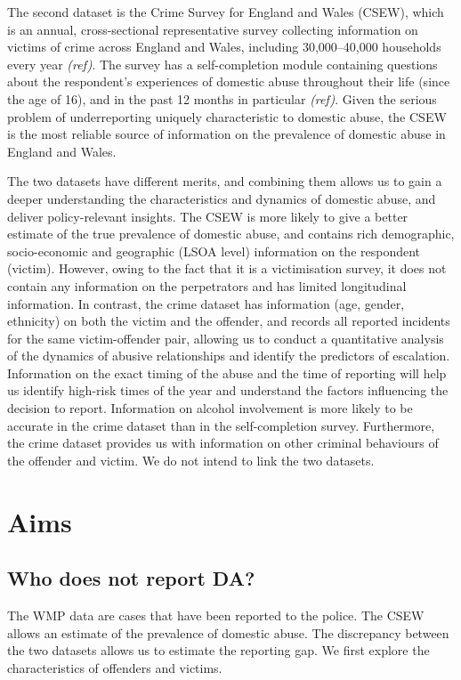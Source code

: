 \documentclass[11pt, a4paper]{article}
\begin{document}
The second dataset is the Crime Survey for England and Wales (CSEW), which is an annual, cross-sectional representative survey collecting information on victims of crime across England and Wales, including 30,000--40,000 households every year \textit{(ref)}. The survey has a self-completion module containing questions about the respondent's experiences of domestic abuse throughout their life (since the age of 16), and in the past 12 months in particular \textit{(ref)}. Given the serious problem of underreporting uniquely characteristic to domestic abuse, the CSEW is the most reliable source of information on the prevalence of domestic abuse in England and Wales.   

The two datasets have different merits, and combining them allows us to gain a deeper understanding the characteristics and dynamics of domestic abuse, and deliver policy-relevant insights. The CSEW is more likely to give a better estimate of the true prevalence of domestic abuse, and contains rich demographic, socio-economic and geographic (LSOA level) information on the respondent (victim). However, owing to the fact that it is a victimisation survey, it does not contain any information on the perpetrators and has limited longitudinal information. In contrast, the crime dataset has information (age, gender, ethnicity) on both the victim and the offender, and records all reported incidents for the same victim-offender pair, allowing us to conduct a quantitative analysis of the dynamics of abusive relationships and identify the predictors of escalation. Information on the exact timing of the abuse and the time of reporting will help us identify high-risk times of the year and understand the factors influencing the decision to report. Information on alcohol involvement is more likely to be accurate in the crime dataset than in the self-completion survey. Furthermore, the crime dataset provides us with information on other criminal behaviours of the offender and victim.  We do not intend to link the two datasets.



\section{Aims}

\subsection{Who does not report DA?}

The WMP data are cases that have been reported to the police. The CSEW allows an estimate of the prevalence of domestic abuse. The discrepancy between the two datasets allows us to estimate the reporting gap. We first explore the characteristics of offenders and victims. 
\end{document}
